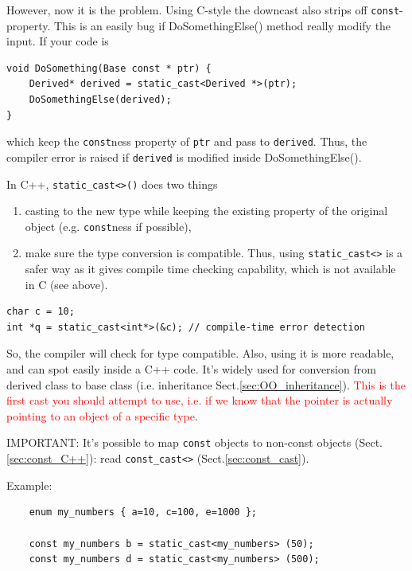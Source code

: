 However, now it is the problem. Using C-style the downcast also strips off
\verb!const!-property. This is an easily bug if DoSomethingElse() method really
modify the input. If your code is
\begin{verbatim}
void DoSomething(Base const * ptr) {
    Derived* derived = static_cast<Derived *>(ptr);
    DoSomethingElse(derived);
}
\end{verbatim}
which keep the \verb!const!ness property of \verb!ptr! and pass to
\verb!derived!. Thus, the compiler error is raised if \verb!derived! is modified
inside DoSomethingElse().

\begin{mdframed}

In C++, \verb!static_cast<>()! does two things 
\begin{enumerate}
  \item casting to the new type while keeping the existing property of the
  original object (e.g. \verb!const!ness if possible), 
  
  \item make sure the type conversion is compatible. Thus, using
  \verb!static_cast<>! is a safer way as it gives compile time checking
  capability, which is not available in C (see above).  
\end{enumerate}

\end{mdframed}

\begin{verbatim}
char c = 10;
int *q = static_cast<int*>(&c); // compile-time error detection
\end{verbatim}

So, the compiler will check for type compatible. Also, using it is more
readable, and can spot easily inside a C++ code. It's widely used for conversion
from derived class to base class (i.e. inheritance
Sect.\ref{sec:OO_inheritance}). \textcolor{red}{This is the first cast you
should attempt to use, i.e. if we know that the pointer is actually pointing to
an object of a specific type}. 

IMPORTANT: It's possible to map \verb!const! objects to non-const objects
(Sect.\ref{sec:const_C++}): read \verb!const_cast<>!
(Sect.\ref{sec:const_cast}).

Example:
\begin{verbatim}
	enum my_numbers { a=10, c=100, e=1000 };

	const my_numbers b = static_cast<my_numbers> (50);
	const my_numbers d = static_cast<my_numbers> (500);
\end{verbatim}

